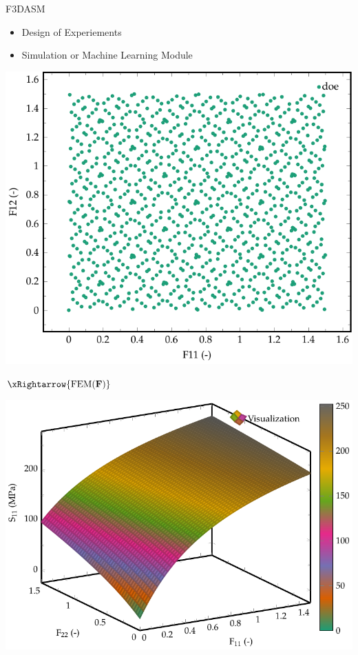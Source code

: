\begin{frame}{F3DASM}
\centering
\begin{minipage}{0.55\textwidth}
		\begin{itemize}
		\item Design of Experiements
		\item Simulation or Machine Learning Module
	\end{itemize}	
\end{minipage}

\begin{minipage}{0.4\textwidth}
	\includegraphics[width=\textwidth]{Figures/F3DASM/doe}
\end{minipage}%
\hspace{1mm}$\xRightarrow{\text{FEM}(\mathbf{F})}$
\begin{minipage}{0.4\textwidth}
	\includegraphics[width=\textwidth]{Figures/F3DASM/manifold}
\end{minipage}%
\end{frame}

